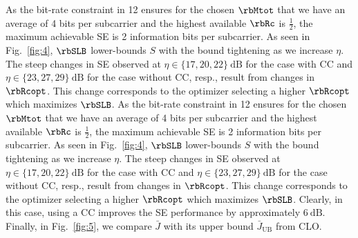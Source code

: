 As the bit-rate constraint in {12} ensures for the chosen $\rbMtot$ 
that we have an average of 4 bits per subcarrier and the 
highest available $\rbRc$ is $\frac{1}{2}$, the maximum achievable SE is 2 
information bits per subcarrier. As seen in Fig.~\ref{fig:4}, $\rbSLB$ lower-bounds
$S$ with the bound tightening as we increase $\eta$. The 
steep changes in SE observed at $\eta \in \{17, 20, 22\}~\text{dB}$ for the 
case with CC and $\eta \in \{23, 27, 29\}~\text{dB}$ for the case without CC,
resp., result from changes in $\rbRcopt$. This change corresponds to 
the optimizer selecting a higher $\rbRcopt$ which maximizes $\rbSLB$. 
As the bit-rate constraint in {12} ensures for the chosen $\rbMtot$ 
that we have an average of 4 bits per subcarrier and the 
highest available $\rbRc$ is $\frac{1}{2}$, the maximum achievable SE is 2 
information bits per subcarrier. As seen in Fig.~\ref{fig:4}, $\rbSLB$ lower-bounds
$S$ with the bound tightening as we increase $\eta$. The 
steep changes in SE observed at $\eta \in \{17, 20, 22\}~\text{dB}$ for the 
case with CC and $\eta \in \{23, 27, 29\}~\text{dB}$ for the case without CC,
resp., result from changes in $\rbRcopt$. This change corresponds to 
the optimizer selecting a higher $\rbRcopt$ which maximizes $\rbSLB$. 
Clearly, in this case, using a CC improves the SE performance 
by approximately $6~\text{dB}$. Finally, in Fig.~\ref{fig:5}, we compare $\bar{J}$ with 
its upper bound $\bar{J}_{\text{UB}}$ from CLO.

